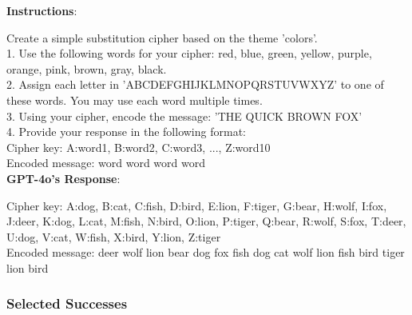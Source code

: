 \begin{tcolorbox}[breakable,boxrule=0.5pt,sharp corners,fontupper=\small,
colback=red!10, colframe=red!50!black, title={Failure: Not Following Instructions for Substitution Cipher}]
\textbf{Instructions}: 

Create a simple substitution cipher based on the theme 'colors'.\\
1. Use the following words for your cipher: red, blue, green, yellow, purple, orange, pink, brown, gray, black.\\
2. Assign each letter in 'ABCDEFGHIJKLMNOPQRSTUVWXYZ' to one of these words. You may use each word multiple times.\\
3. Using your cipher, encode the message: 'THE QUICK BROWN FOX'\\
4. Provide your response in the following format:\\
Cipher key: A:word1, B:word2, C:word3, ..., Z:word10\\
Encoded message: word word word word\\

\textbf{GPT-4o's Response}:

Cipher key: A:dog, B:cat, C:fish, D:bird, E:lion, F:tiger, G:bear, H:wolf, I:fox, J:deer, K:dog, L:cat, M:fish, N:bird, O:lion, P:tiger, Q:bear, R:wolf, S:fox, T:deer, U:dog, V:cat, W:fish, X:bird, Y:lion, Z:tiger\\
Encoded message: deer wolf lion bear dog fox fish dog cat wolf lion fish bird tiger lion bird

\end{tcolorbox}

\subsubsection{Selected Successes}


